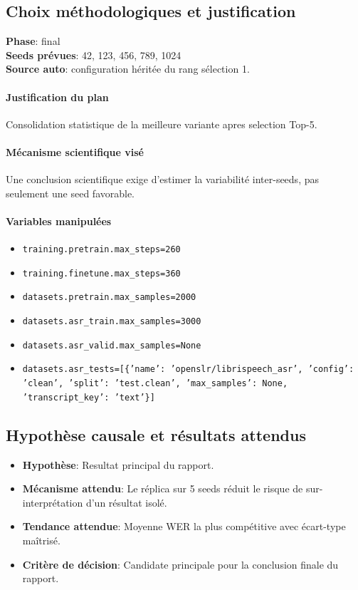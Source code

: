 \documentclass[11pt,a4paper]{article}
\begin{document}
\subsection{Choix méthodologiques et justification}
\textbf{Phase}: final\\
\textbf{Seeds prévues}: 42, 123, 456, 789, 1024\\
\textbf{Source auto}: configuration héritée du rang sélection 1.

\paragraph{Justification du plan}
Consolidation statistique de la meilleure variante apres selection Top-5.

\paragraph{Mécanisme scientifique visé}
Une conclusion scientifique exige d'estimer la variabilité inter-seeds, pas seulement une seed favorable.

\paragraph{Variables manipulées}
\begin{itemize}
\item \texttt{training.pretrain.max\_steps=260}
\item \texttt{training.finetune.max\_steps=360}
\item \texttt{datasets.pretrain.max\_samples=2000}
\item \texttt{datasets.asr\_train.max\_samples=3000}
\item \texttt{datasets.asr\_valid.max\_samples=None}
\item \texttt{datasets.asr\_tests=[\{'name': 'openslr/librispeech\_asr', 'config': 'clean', 'split': 'test.clean', 'max\_samples': None, 'transcript\_key': 'text'\}]}
\end{itemize}

\subsection{Hypothèse causale et résultats attendus}
\begin{itemize}[leftmargin=1.2cm]
\item \textbf{Hypothèse}: Resultat principal du rapport.
\item \textbf{Mécanisme attendu}: Le réplica sur 5 seeds réduit le risque de sur-interprétation d'un résultat isolé.
\item \textbf{Tendance attendue}: Moyenne WER la plus compétitive avec écart-type maîtrisé.
\item \textbf{Critère de décision}: Candidate principale pour la conclusion finale du rapport.
\end{itemize}
\end{document}
